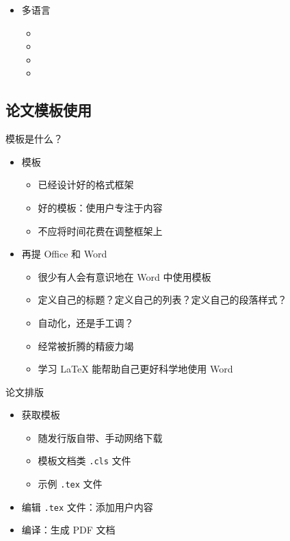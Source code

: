 \begin{frame}[fragile]
\begin{multicols}{3}
\begin{itemize}
      \item 多语言

            \begin{itemize}
              \item {}
              \item {}
              \item {}
              \item {}
            \end{itemize}
    \end{itemize}
  \end{multicols}
  \vspace*{-0.5cm}
\end{frame}

\subsection{论文模板使用}

\begin{frame}{模板是什么？}
  \begin{itemize}
    \item 模板
          \begin{itemize}
            \item 已经设计好的格式框架
            \item 好的模板：使用户专注于内容
            \item 不应将时间花费在调整框架上
          \end{itemize}
    \item 再提 Office 和 Word
          \begin{itemize}
            \item 很少有人会有意识地在 Word 中使用模板
            \item 定义自己的标题？定义自己的列表？定义自己的段落样式？
            \item 自动化，还是手工调？
            \item 经常被折腾的精疲力竭
            \item 学习 \LaTeX{} 能帮助自己更好科学地使用 Word
          \end{itemize}
  \end{itemize}
\end{frame}

\begin{frame}{论文排版}
  \begin{itemize}
    \item 获取模板
          \begin{itemize}
            \item 随发行版自带、手动网络下载
            \item 模板文档类 \texttt{.cls} 文件
            \item 示例 \texttt{.tex} 文件
          \end{itemize}
    \item 编辑 \texttt{.tex} 文件：添加用户内容
    \item 编译：生成 PDF 文档
  \end{itemize}
\end{frame}

